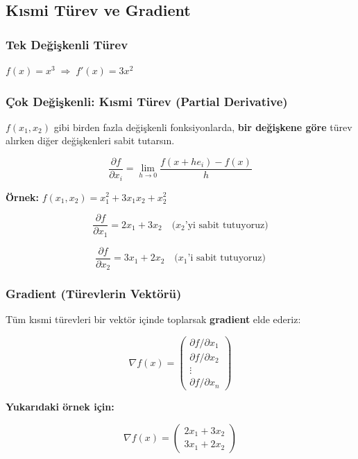 \documentclass[12pt,a4paper]{article}
\theoremstyle{definition}
\theoremstyle{remark}
\begin{document}
\subsection{K{\i}smi T\"urev ve Gradient}

\subsubsection{Tek De\u{g}i\c{s}kenli T\"urev}
$f(x) = x^3 \;\Rightarrow\; f'(x) = 3x^2$

\subsubsection{\c{C}ok De\u{g}i\c{s}kenli: K{\i}smi T\"urev (Partial Derivative)}

$f(x_1, x_2)$ gibi birden fazla de\u{g}i\c{s}kenli fonksiyonlarda, \textbf{bir de\u{g}i\c{s}kene g\"ore} t\"urev al{\i}rken di\u{g}er de\u{g}i\c{s}kenleri sabit tutars{\i}n.

\[
\frac{\partial f}{\partial x_i} = \lim_{h \to 0} \frac{f(x + h e_i) - f(x)}{h}
\]

\textbf{\"Ornek:} $f(x_1, x_2) = x_1^2 + 3x_1 x_2 + x_2^2$

\[
\frac{\partial f}{\partial x_1} = 2x_1 + 3x_2 \quad \text{($x_2$'yi sabit tutuyoruz)}
\]

\[
\frac{\partial f}{\partial x_2} = 3x_1 + 2x_2 \quad \text{($x_1$'i sabit tutuyoruz)}
\]

\subsubsection{Gradient (T\"urevlerin Vekt\"or\"u)}

T\"um k{\i}smi t\"urevleri bir vekt\"or i\c{c}inde toplarsak \textbf{gradient} elde ederiz:

\[
\nabla f(x) = \begin{pmatrix} \partial f / \partial x_1 \\ \partial f / \partial x_2 \\ \vdots \\ \partial f / \partial x_n \end{pmatrix}
\]

\textbf{Yukar{\i}daki \"ornek i\c{c}in:}

\[
\nabla f(x) = \begin{pmatrix} 2x_1 + 3x_2 \\ 3x_1 + 2x_2 \end{pmatrix}
\]
\end{document}
